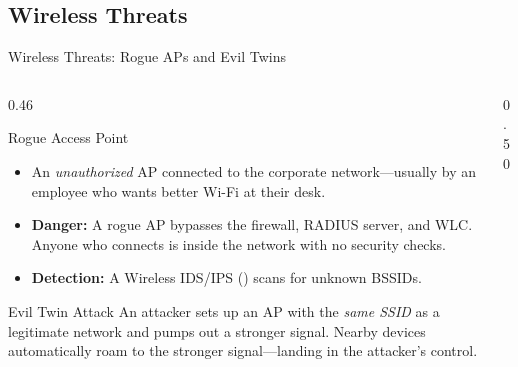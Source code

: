 \documentclass[aspectratio=169]{beamer}
\begin{document}
\subsection{Wireless Threats}

\begin{frame}[shrink=5]{Wireless Threats: Rogue APs and Evil Twins}
    \begin{columns}[T]
        \begin{column}{0.46\textwidth}
            \begin{block}{Rogue Access Point}
                \footnotesize
                \begin{itemize}
                    \item An \emph{unauthorized} AP connected to the corporate network---usually by an employee who wants better Wi-Fi at their desk.
                    \item \textbf{Danger:} A rogue AP bypasses the firewall, RADIUS server, and WLC. Anyone who connects is inside the network with no security checks.
                    \item \textbf{Detection:} A Wireless IDS/IPS () scans for unknown BSSIDs.
                \end{itemize}
            \end{block}
            \vspace{0.2em}
            \begin{block}{Evil Twin Attack}
                \footnotesize
                An attacker sets up an AP with the \emph{same SSID} as a legitimate network and pumps out a stronger signal. Nearby devices automatically roam to the stronger signal---landing in the attacker's control.
            \end{block}
        \end{column}
        \begin{column}{0.50\textwidth}
            \begin{center}
\end{center}
\end{column}
\end{columns}
\end{frame}
\end{document}
